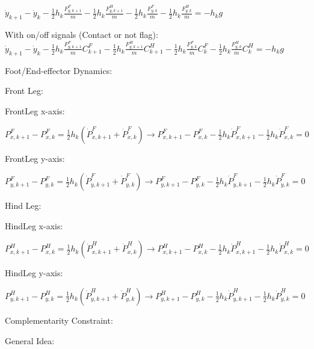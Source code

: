 \documentclass[a4paper,10pt]{article}
\begin{document}
$\dot{y}_{k+1}-\dot{y}_k  - \frac{1}{2}h_k\frac{F^F_{y,k+1}}{m} - \frac{1}{2}h_k\frac{F^H_{y,k+1}}{m}  - \frac{1}{2}h_k\frac{F^F_{y,k}}{m} - \frac{1}{2}h_k\frac{F^H_{y,k}}{m} = - h_kg$

With on/off signals (Contact or not flag):
$\dot{y}_{k+1}-\dot{y}_k  - \frac{1}{2}h_k\frac{F^F_{y,k+1}}{m}C^F_{k+1} - \frac{1}{2}h_k\frac{F^H_{y,k+1}}{m}C^H_{k+1}  - \frac{1}{2}h_k\frac{F^F_{y,k}}{m}C^F_{k} - \frac{1}{2}h_k\frac{F^H_{y,k}}{m}C^H_{k} = - h_kg$

\vspace{3mm}

Foot/End-effector Dynamics:

Front Leg:

FrontLeg x-axis: 

$P^F_{x,k+1}-P^F_{x,k} = \frac{1}{2}h_k(\dot{P}^F_{x,k+1}+\dot{P}^F_{x,k}) \rightarrow P^F_{x,k+1}-P^F_{x,k} - \frac{1}{2}h_k\dot{P}^F_{x,k+1} - \frac{1}{2}h_k\dot{P}^F_{x,k}  = 0$

\vspace{2mm}

FrontLeg y-axis:

$P^F_{y,k+1}-P^F_{y,k} = \frac{1}{2}h_k(\dot{P}^F_{y,k+1}+\dot{P}^F_{y,k}) \rightarrow P^F_{y,k+1}-P^F_{y,k} - \frac{1}{2}h_k\dot{P}^F_{y,k+1} - \frac{1}{2}h_k\dot{P}^F_{y,k}  = 0$

\vspace{3mm}

Hind Leg:

HindLeg x-axis:

$P^H_{x,k+1}-P^H_{x,k} = \frac{1}{2}h_k(\dot{P}^H_{x,k+1}+\dot{P}^H_{x,k}) \rightarrow P^H_{x,k+1}-P^H_{x,k} - \frac{1}{2}h_k\dot{P}^H_{x,k+1} - \frac{1}{2}h_k\dot{P}^H_{x,k}  = 0$

\vspace{2mm}

HindLeg y-axis:

$P^H_{y,k+1}-P^H_{y,k} = \frac{1}{2}h_k(\dot{P}^H_{y,k+1}+\dot{P}^H_{y,k}) \rightarrow P^H_{y,k+1}-P^H_{y,k} - \frac{1}{2}h_k\dot{P}^H_{y,k+1} - \frac{1}{2}h_k\dot{P}^H_{y,k}  = 0$

\vspace{3mm}

Complementarity Constraint:
\vspace{2mm}

General Idea:
\end{document}
